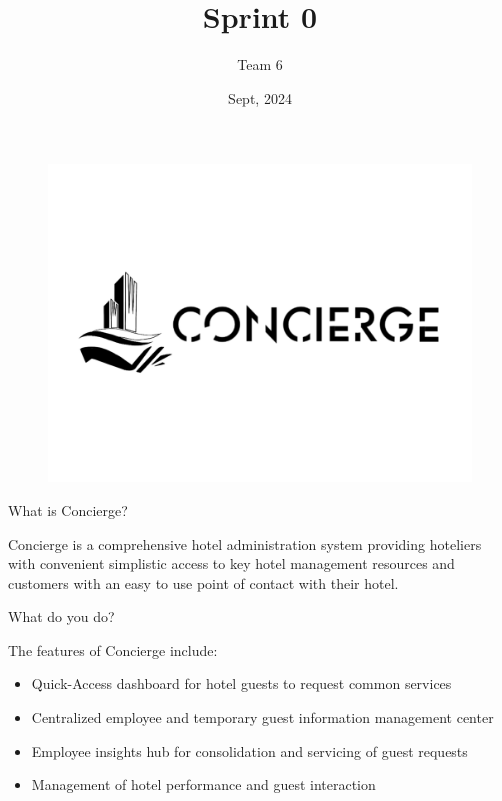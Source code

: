 \documentclass{beamer}
\title{Sprint 0}
\institute{COMP 4350}
\date{Sept, 2024}
\author{Team 6}
\begin{document}
\frame{\titlepage}

\begin{frame}
    \begin{figure}
        \centering
        \includegraphics[width=1\linewidth]{images/logo.png}
    \end{figure}
\end{frame}
\begin{frame}{What is Concierge?}

    Concierge is a comprehensive hotel administration system providing hoteliers with convenient simplistic access to key hotel management resources and customers with an easy to use point of contact with their hotel. 

\end{frame}

\beamerdefaultoverlayspecification{<+->}

\begin{frame}{What do you do?}

    The features of Concierge include:
    \begin{itemize}
        \item Quick-Access dashboard for hotel guests to request common services
        \item Centralized employee and temporary guest information management center
        \item Employee insights hub for consolidation and servicing of guest requests
        \item Management of hotel performance and guest interaction
    \end{itemize}
\end{frame}
\end{document}
